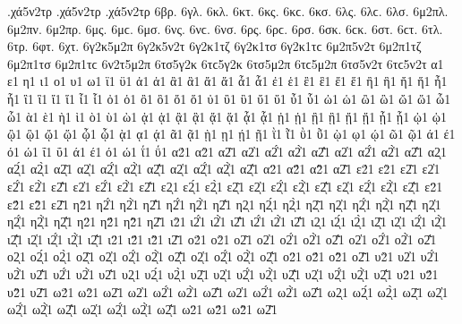 {.χά5ν2τρ .χά5ν2τρ .χά5ν2τρ 
6βρ.   %
6γλ.   %
6κλ.   %
6κτ.   %
6κς. 6κϲ.   %
6κσ. 
6λς. 6λϲ.   %
6λσ. 
6μ2πλ.   %
6μ2πν.   %
6μ2πρ.   %
6μς. 6μϲ.   %
6μσ. 
6νς. 6νϲ.   %
6νσ. 
6ρς. 6ρϲ.   %
6ρσ. 
6σκ. 6ϲκ.   %
6στ. 6ϲτ.   %
6τλ.   %
6τρ.   %
6φτ.   %
6χτ.   %
6γ2κ5μ2π 
6γ2κ5ν2τ 
6γ2κ1τζ 
6γ2κ1τσ 6γ2κ1τϲ 
6μ2π5ν2τ 
6μ2π1τζ 
6μ2π1τσ 6μ2π1τϲ 
6ν2τ5μ2π 
6τσ5γ2κ 6τϲ5γ2κ 
6τσ5μ2π 6τϲ5μ2π 
6τσ5ν2τ 6τϲ5ν2τ 
α1 ε1 η1 ι1 ο1 υ1 ω1 ϊ1 ϋ1 ἀ1 ἁ1 ἂ1 ἃ1 ἄ1 ἅ1 ἆ1 ἇ1 ἐ1 ἑ1 ἒ1 ἓ1 ἔ1 ἕ1 ἢ1 ἣ1 ἤ1 ἥ1 ἦ1 ἧ1 ἲ1 ἳ1 ἴ1 ἵ1 ἶ1 ἷ1 ὀ1 ὁ1 ὂ1 ὃ1 ὄ1 ὅ1 ὐ1 ὒ1 ὓ1 ὔ1 ὕ1 ὖ1 ὗ1 ὠ1 ὡ1 ὢ1 ὣ1 ὤ1 ὥ1 ὦ1 ὧ1 ὰ1 ὲ1 ὴ1 ὶ1 ὸ1 ὺ1 ὼ1 ᾀ1 ᾁ1 ᾂ1 ᾃ1 ᾄ1 ᾅ1 ᾆ1 ᾇ1 ᾐ1 ᾑ1 ᾒ1 ᾓ1 ᾔ1 ᾕ1 ᾖ1 ᾗ1 ᾠ1 ᾡ1 ᾢ1 ᾣ1 ᾤ1 ᾥ1 ᾦ1 ᾧ1 ᾲ1 ᾳ1 ᾴ1 ᾶ1 ᾷ1 ῂ1 ῃ1 ῄ1 ῇ1 ῒ1 ῗ1 ῢ1 ῧ1 ῲ1 ῳ1 ῴ1 ῶ1 ῷ1 ά1 έ1 ό1 ώ1 ΐ1 ΰ1 ά1 έ1 ό1 ώ1 ΐ1 ΰ1 α2́1 α2̀1 α2͂1 α2̓1 α2̓́1 α2̓̀1 α2̓͂1 α2̔1 α2̔́1 α2̔̀1 α2̔͂1 α2ͅ1 α2́ͅ1 α2̀ͅ1 α2͂ͅ1 α2̓ͅ1 α2̓́ͅ1 α2̓̀ͅ1 α2̓͂ͅ1 α2̔ͅ1 α2̔́ͅ1 α2̔̀ͅ1 α2̔͂ͅ1 α2̈1 α2̈́1 α2̈̀1 α2̈͂1 ε2́1 ε2̀1 ε2͂1 ε2̓1 ε2̓́1 ε2̓̀1 ε2̓͂1 ε2̔1 ε2̔́1 ε2̔̀1 ε2̔͂1 ε2ͅ1 ε2́ͅ1 ε2̀ͅ1 ε2͂ͅ1 ε2̓ͅ1 ε2̓́ͅ1 ε2̓̀ͅ1 ε2̓͂ͅ1 ε2̔ͅ1 ε2̔́ͅ1 ε2̔̀ͅ1 ε2̔͂ͅ1 ε2̈1 ε2̈́1 ε2̈̀1 ε2̈͂1 η2̀1 η2̓́1 η2̓̀1 η2̓͂1 η2̔́1 η2̔̀1 η2̔͂1 η2ͅ1 η2́ͅ1 η2̀ͅ1 η2͂ͅ1 η2̓ͅ1 η2̓́ͅ1 η2̓̀ͅ1 η2̓͂ͅ1 η2̔ͅ1 η2̔́ͅ1 η2̔̀ͅ1 η2̔͂ͅ1 η2̈1 η2̈́1 η2̈̀1 η2̈͂1 ι2̀1 ι2̓́1 ι2̓̀1 ι2̓͂1 ι2̔́1 ι2̔̀1 ι2̔͂1 ι2ͅ1 ι2́ͅ1 ι2̀ͅ1 ι2͂ͅ1 ι2̓ͅ1 ι2̓́ͅ1 ι2̓̀ͅ1 ι2̓͂ͅ1 ι2̔ͅ1 ι2̔́ͅ1 ι2̔̀ͅ1 ι2̔͂ͅ1 ι2̈1 ι2̈́1 ι2̈̀1 ι2̈͂1 ο2́1 ο2̀1 ο2͂1 ο2̓1 ο2̓́1 ο2̓̀1 ο2̓͂1 ο2̔1 ο2̔́1 ο2̔̀1 ο2̔͂1 ο2ͅ1 ο2́ͅ1 ο2̀ͅ1 ο2͂ͅ1 ο2̓ͅ1 ο2̓́ͅ1 ο2̓̀ͅ1 ο2̓͂ͅ1 ο2̔ͅ1 ο2̔́ͅ1 ο2̔̀ͅ1 ο2̔͂ͅ1 ο2̈1 ο2̈́1 ο2̈̀1 ο2̈͂1 υ2̀1 υ2̓1 υ2̓́1 υ2̓̀1 υ2̓͂1 υ2̔́1 υ2̔̀1 υ2̔͂1 υ2ͅ1 υ2́ͅ1 υ2̀ͅ1 υ2͂ͅ1 υ2̓ͅ1 υ2̓́ͅ1 υ2̓̀ͅ1 υ2̓͂ͅ1 υ2̔ͅ1 υ2̔́ͅ1 υ2̔̀ͅ1 υ2̔͂ͅ1 υ2̈1 υ2̈́1 υ2̈̀1 υ2̈͂1 ω2́1 ω2̀1 ω2͂1 ω2̓1 ω2̓́1 ω2̓̀1 ω2̓͂1 ω2̔1 ω2̔́1 ω2̔̀1 ω2̔͂1 ω2ͅ1 ω2́ͅ1 ω2̀ͅ1 ω2͂ͅ1 ω2̓ͅ1 ω2̓́ͅ1 ω2̓̀ͅ1 ω2̓͂ͅ1 ω2̔ͅ1 ω2̔́ͅ1 ω2̔̀ͅ1 ω2̔͂ͅ1 ω2̈1 ω2̈́1 ω2̈̀1 ω2̈͂1 
}
\endgroup
\endinput
